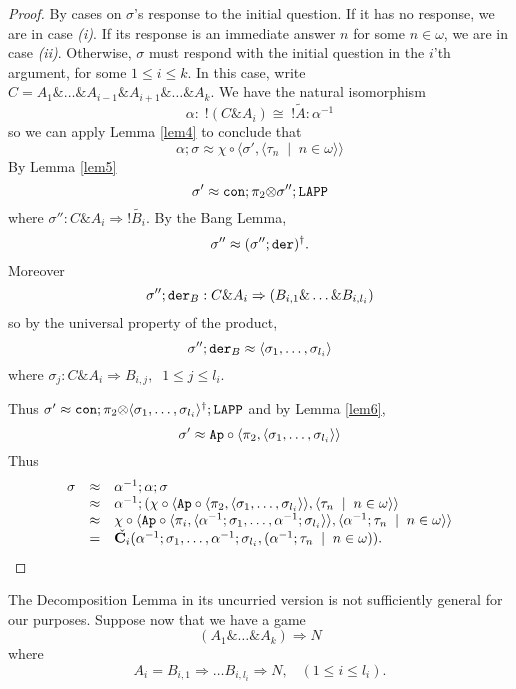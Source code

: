 \documentclass[11pt]{article}
\newcommand{\with}{\mbox{$\&$}}
\newcommand{\tensor}{\mbox{$\otimes$}}
\newcommand{\lang}{\langle}
\newcommand{\rang}{\rangle}
\begin{document}
\begin{proof} By cases on $\sigma$'s response to the initial
question. If it has no response, we are in case {\it (i)}. If its
response is an immediate answer $n$ for some $n\in\omega$, we are
in case {\it (ii)}. Otherwise, $\sigma$ must respond with the
initial question in the $i$'th argument, for some $1\leq i \leq
k$. In this case, write $C=A_1\with\dots\with A_{i-1}\with
A_{i+1}\with\dots\with A_k$. We have the natural isomorphism
$$\alpha : \; !(C\with A_i)\cong \; !\tilde{A} :\alpha^{-1}$$ so
we can apply Lemma \ref{lem4} to conclude that
$$\alpha;\sigma\approx \chi\circ \lang \sigma',\lang \tau_n\;\mid
\; n\in\omega\rang \rang $$ By Lemma \ref{lem5}
$$\sigma'\approx{\tt con};\pi_2\tensor \sigma'';{\tt LAPP }$$
where $\sigma'':C\with A_i\Rightarrow !\tilde{B_i}$. By the Bang
Lemma, $$\sigma''\approx(\sigma'';{\tt der})^{\dag}.$$ Moreover
$$\sigma'';{\tt der}_B:C\with A_i\Rightarrow (B_{i,1}\with
\dots\with B_{i,l_i})$$ so by the universal property of the
product, $$\sigma'';{\tt der}_B\approx\lang
\sigma_1,\dots,\sigma_{l_i}\rang $$ where $\sigma_j:C\with
A_i\Rightarrow B_{i,j},\;\; 1\leq j\leq l_i$.

Thus $\sigma'\approx{\tt con};\pi_2\tensor
\lang \sigma_1,\dots,\sigma_{l_i}\rang^{\dag};{\tt LAPP } $ and by Lemma \ref{lem6},
$$\sigma'\approx {\tt Ap }\circ\lang \pi_2,\lang \sigma_1,\dots,\sigma_{l_i}\rang \rang $$
Thus
\[
\begin{array}{lcl}
\sigma &\approx & \alpha^{-1};\alpha;\sigma \\
 &\approx&
 \alpha^{-1};(\chi\circ\lang {\tt Ap }\circ\lang \pi_2,\lang \sigma_1,\dots,\sigma_{l_i}\rang \rang ,\lang \tau_n\;\mid \; n\in\omega\rang \rang  \\
&\approx & \chi\circ \lang {\tt Ap }\circ\lang \pi_i,\lang
\alpha^{-1};\sigma_1,\dots,\alpha^{-1};\sigma_{l_i}\rang \rang ,
\lang \alpha^{-1};\tau_n\;\mid \; n\in\omega\rang \rang  \\ &=&
\check{{\bf
C}_i}(\alpha^{-1};\sigma_1,\dots,\alpha^{-1};\sigma_{l_i},
(\alpha^{-1};\tau_n\;\mid \;n\in\omega)) .
\end{array}
\]
\end{proof}

The Decomposition Lemma in its uncurried version is not sufficiently
general for our purposes. Suppose now that we have a game
$$(A_1\with\dots\with A_k)\Rightarrow N$$
where
$$A_i=B_{i,1}\Rightarrow \dots B_{i,l_i}\Rightarrow N, \; \;\; (1\leq
i\leq l_i).$$
\end{document}
